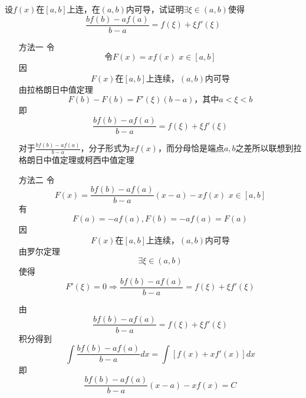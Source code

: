 \begin{example}
	设$f(x)$在$[a,b]$上连，在$(a,b)$内可导，试证明$\exists\xi\in(a,b)$使得\[\frac{bf(b)-af(a)}{b-a}=f(\xi)+\xi f'(\xi)\]
\end{example}
	\begin{newproof}
		\begin{itemize}
			\item[方法一] 令\[\text{令}F\left( x \right) =xf\left( x \right) \,\,  x\in \left[ a,b \right] \]
			因\[F\left( x \right) \text{在}\left[ a,b \right] \text{上连续，}\left( a,b \right) \text{内可导}\]
			由拉格朗日中值定理\[F\left( b \right) -F\left( b \right) =F'\left( \xi \right) \left( b-a \right) \text{，其中}a<\xi <b\]
			即\[\frac{bf\left( b \right) -af\left( a \right)}{b-a}=f\left( \xi \right) +\xi f'\left( \xi \right) \]
			\begin{note}
				对于$\frac{bf\left( b \right) -af\left( a \right)}{b-a}$，分子形式为$xf\left( x \right) $，而分母恰是端点$a,b$之差所以联想到拉格朗日中值定理或柯西中值定理
			\end{note}
			\item[方法二] 令\[F\left( x \right) =\frac{bf\left( b \right) -af\left( a \right)}{b-a}\left( x-a \right) -xf\left( x \right) \,\,  x\in \left[ a,b \right] \]
			有\[F\left( a \right) =-af\left( a \right) ,F\left( b \right) =-af\left( a \right) =F\left( a \right) \]
			因\[F\left( x \right) \text{在}\left[ a,b \right] \text{上连续，}\left( a,b \right) \text{内可导}\]
			由罗尔定理\[\exists \xi \in \left( a,b \right) \]
			使得\[F'\left( \xi \right) =0\Longrightarrow \frac{bf\left( b \right) -af\left( a \right)}{b-a}=f\left( \xi \right) +\xi f'\left( \xi \right) \]
			\begin{note}
				由\[\frac{bf\left( b \right) -af\left( a \right)}{b-a}=f\left( \xi \right) +\xi f'\left( \xi \right) \]
				积分得到\[\int{\frac{bf\left( b \right) -af\left( a \right)}{b-a}dx}=\int{\left[ f\left( x \right) +xf'\left( x \right) \right] dx}\]
				即\[\frac{bf\left( b \right) -af\left( a \right)}{b-a}\left( x-a \right) -xf\left( x \right) =C\]
			\end{note}
		\end{itemize}
	\end{newproof}

